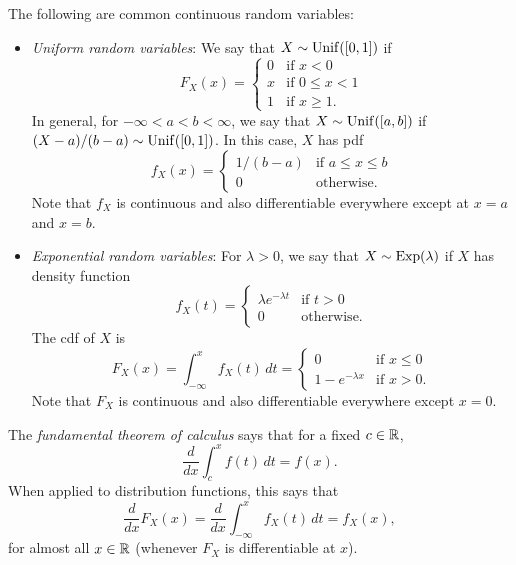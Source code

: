 \begin{example}
  The following are common continuous random variables:
  \begin{itemize}
    \item \emph{Uniform random variables}: We say that
      $X \sim \operatorname{Unif}([0, 1])$ if
      \[
        F_X(x) =
        \begin{cases}
          0 & \text{if $x < 0$} \\
          x & \text{if $0 \le x < 1$} \\
          1 & \text{if $x \ge 1$}.
        \end{cases}
      \]
      In general, for $-\infty < a < b < \infty$, we
      say that $X \sim \operatorname{Unif}([a, b])$ if
      $(X - a) / (b - a) \sim \operatorname{Unif}([0, 1])$. In
      this case, $X$ has pdf
      \[
        f_X(x) =
        \begin{cases}
          1 / (b - a) & \text{if $a \le x \le b$} \\
          0 & \text{otherwise}.
        \end{cases}
      \]
      Note that $f_X$ is continuous and
      also differentiable everywhere except at
      $x = a$ and $x = b$.
    \item \emph{Exponential random variables}: For
      $\lambda > 0$, we say that $X \sim \operatorname{Exp}(\lambda)$
      if $X$ has density function
      \[
        f_X(t) =
        \begin{cases}
          \lambda e^{-\lambda t} & \text{if $t > 0$} \\
          0 & \text{otherwise}.
        \end{cases}
      \]
      The cdf of $X$ is
      \[
        F_X(x) = \int_{-\infty}^x f_X(t) \, dt =
        \begin{cases}
          0 & \text{if $x \le 0$} \\
          1 - e^{-\lambda x} & \text{if $x > 0$}.
        \end{cases}
      \]
      Note that $F_X$ is continuous and also
      differentiable everywhere except $x = 0$.
  \end{itemize}
\end{example}

\begin{remark}
  The \emph{fundamental theorem of calculus} says that
  for a fixed $c \in \mathbb{R}$,
  \[
    \frac{d}{dx} \int_{c}^x f(t) \, dt = f(x).
  \]
  When applied to distribution functions, this says
  that
  \[
    \frac{d}{dx} F_X(x) =
    \frac{d}{dx} \int_{-\infty}^x f_X(t) \, dt
    = f_X(x),
  \]
  for almost all $x \in \mathbb{R}$ (whenever $F_X$ is
  differentiable at $x$).
\end{remark}

